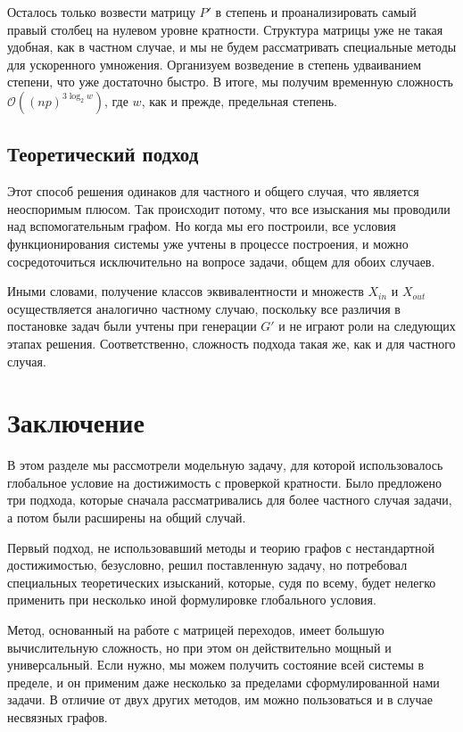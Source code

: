 Осталось только возвести матрицу $P'$ в степень и проанализировать самый правый столбец на нулевом уровне кратности. Структура матрицы уже не такая удобная, как в частном случае, и мы не будем рассматривать специальные методы для ускоренного умножения. Организуем возведение в степень удваиванием степени, что уже достаточно быстро. В итоге, мы получим временную сложность $\mathcal{O}((np)^{3 \log_2 w})$, где $w$, как и прежде, предельная степень.

\subsection{Теоретический подход}

Этот способ решения одинаков для частного и общего случая, что является неоспоримым плюсом. Так происходит потому, что все изыскания мы проводили над вспомогательным графом. Но когда мы его построили, все условия функционирования системы уже учтены в процессе построения, и можно сосредоточиться исключительно на вопросе задачи, общем для обоих случаев. 

Иными словами, получение классов эквивалентности и множеств $X_{in}$ и $X_{out}$ осуществляется аналогично частному случаю, поскольку все различия в постановке задач были учтены при генерации $G'$ и не играют роли на следующих этапах решения. Соответственно, сложность подхода такая же, как и для частного случая. 

\section{Заключение}

В этом разделе мы рассмотрели модельную задачу, для которой использовалось глобальное условие на достижимость с проверкой кратности. Было предложено три подхода, которые сначала рассматривались для более частного случая задачи, а потом были расширены на общий случай. 

Первый подход, не использовавший методы и теорию графов с нестандартной достижимостью, безусловно, решил поставленную задачу, но потребовал специальных теоретических изысканий, которые, судя по всему, будет нелегко применить при несколько иной формулировке глобального условия. 

Метод, основанный на работе с матрицей переходов, имеет большую вычислительную сложность, но при этом он действительно мощный и универсальный. Если нужно, мы можем получить состояние всей системы в пределе, и он применим даже несколько за пределами сформулированной нами задачи. В отличие от двух других методов, им можно пользоваться и в случае несвязных графов. 

